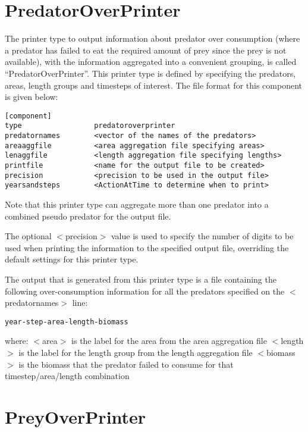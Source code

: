 \documentclass[]{book}
\begin{document}
\hypertarget{sec:predatoroverprinter}{%
\section{PredatorOverPrinter}\label{sec:predatoroverprinter}}

The printer type to output information about predator over consumption
(where a predator has failed to eat the required amount of prey since
the prey is not available), with the information aggregated into a
convenient grouping, is called ``PredatorOverPrinter''. This printer type
is defined by specifying the predators, areas, length groups and
timesteps of interest. The file format for this component is given
below:

\begin{verbatim}
[component]
type                 predatoroverprinter
predatornames        <vector of the names of the predators>
areaaggfile          <area aggregation file specifying areas>
lenaggfile           <length aggregation file specifying lengths>
printfile            <name for the output file to be created>
precision            <precision to be used in the output file>
yearsandsteps        <ActionAtTime to determine when to print>
\end{verbatim}

Note that this printer type can aggregate more than one predator into a
combined pseudo predator for the output file.

The optional \(<\)precision\(>\) value is used to specify the number of
digits to be used when printing the information to the specified output
file, overriding the default settings for this printer type.

The output that is generated from this printer type is a file containing
the following over-consumption information for all the predators
specified on the \(<\)predatornames\(>\) line:

\begin{verbatim}
year-step-area-length-biomass
\end{verbatim}

where: \(<\)area\(>\) is the label for the area from the area aggregation
file \(<\)length\(>\) is the label for the length group from the length
aggregation file \(<\)biomass\(>\) is the biomass that the predator failed
to consume for that timestep/area/length combination

\hypertarget{sec:preyoverprinter}{%
\section{PreyOverPrinter}\label{sec:preyoverprinter}}
\end{document}
